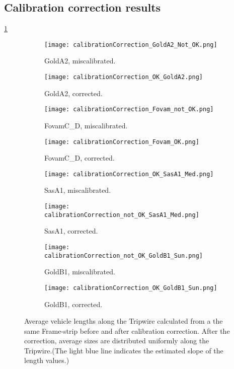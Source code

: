 \subsection{Calibration correction results}
\ref{fig:calibrations2}

\addtolength{\topmargin}{-.6in}
\begin{figure}[p]
	\thispagestyle{empty}
	\centering
	\begin{subfigure}[t]{0.36\textwidth}
		\texttt{[image: calibrationCorrection\_GoldA2\_Not\_OK.png]}
		\caption{GoldA2, miscalibrated.}
	\end{subfigure}
	\quad
	\begin{subfigure}[t]{0.36\textwidth}
		\texttt{[image: calibrationCorrection\_OK\_GoldA2.png]}
		\caption{GoldA2, corrected.}
	\end{subfigure}
	\hfill
	\begin{subfigure}[t]{0.36\textwidth}
		\texttt{[image: calibrationCorrection\_Fovam\_not\_OK.png]}
		\caption{FovamC\_D, miscalibrated.}
	\end{subfigure}
	\quad
	\begin{subfigure}[t]{0.36\textwidth}
		\texttt{[image: calibrationCorrection\_Fovam\_OK.png]}
		\caption{FovamC\_D, corrected.}
	\end{subfigure}
\hfill
\begin{subfigure}[t]{0.36\textwidth}
	\texttt{[image: calibrationCorrection\_OK\_SasA1\_Med.png]}
	\caption{SasA1, miscalibrated.}
\end{subfigure}
\quad
\begin{subfigure}[t]{0.36\textwidth}
	\texttt{[image: calibrationCorrection\_not\_OK\_SasA1\_Med.png]}
	\caption{SasA1, corrected.}
\end{subfigure}
\hfill
\begin{subfigure}[t]{0.36\textwidth}
	\texttt{[image: calibrationCorrection\_not\_OK\_GoldB1\_Sun.png]}
	\caption{GoldB1, miscalibrated.}
\end{subfigure}
\quad
\begin{subfigure}[t]{0.36\textwidth}
	\texttt{[image: calibrationCorrection\_OK\_GoldB1\_Sun.png]}
	\caption{GoldB1, corrected.}
\end{subfigure}
	\caption{Average vehicle lengths along the Tripwire calculated from a the same Frame-strip before and after calibration correction. After the correction, average sizes are distributed uniformly along the Tripwire.(The light blue line indicates the estimated slope of the length values.)\label{fig:calibrations2}}
\end{figure}
